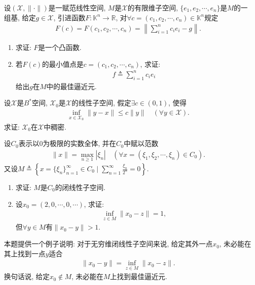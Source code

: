 \documentclass[../../main.tex]{subfiles}%
\begin{document}
\begin{example}
设$(\mathscr{X}, \|\cdot\|)$是一赋范线性空间, $M$是$\mathscr{X}$的有限维子空间, $\{e_1, e_2, \cdots, e_n\}$是$M$的一组基, 给定$g \in \mathscr{X}$, 引进函数$F: \mathbb{K}^n \to \mathbb{R}$, 对$\forall c = (c_1, c_2, \cdots, c_n) \in \mathbb{K}^n$规定
\begin{align*}
F(c) = F(c_1, c_2, \cdots, c_n) = \left\| \sum_{i=1}^{n} c_i e_i - g \right\|.
\end{align*}
\begin{enumerate}[(1)]
\item 求证: $F$是一个凸函数.
\item 若$F(c)$的最小值点是$c = (c_1, c_2, \cdots, c_n)$, 求证:
\begin{align*}
f \triangleq \sum_{i=1}^{n} c_i e_i
\end{align*}
给出$g$在$M$中的最佳逼近元.
\end{enumerate}
\end{example}

\begin{example}
设$\mathscr{X}$是$B^*$空间, $\mathscr{X}_0$是$\mathscr{X}$的线性子空间, 假定$\exists c \in (0, 1)$, 使得
\begin{align*}
\inf_{x \in \mathscr{X}_0} \|y - x\| \leqslant c \|y\| \quad (\forall y \in \mathscr{X}).
\end{align*}
求证: $\mathscr{X}_0$在$\mathscr{X}$中稠密.
\end{example}

\begin{example}
设$C_0$表示以$0$为极限的实数全体, 并在$C_0$中赋以范数
\begin{align*}
\|x\| = \max_{n \geqslant 1} |\xi_n| \quad (\forall x = (\xi_1, \xi_2, \cdots, \xi_n) \in C_0).
\end{align*}
又设$M \triangleq \left\{ x = \{\xi_n\}_{n=1}^{\infty} \in C_0 \mid \sum_{n=1}^{\infty} \frac{\xi_n}{2^n} = 0 \right\}$.
\begin{enumerate}[(1)]
\item 求证: $M$是$C_0$的闭线性子空间.
\item 设$x_0 = (2, 0, \cdots, 0, \cdots)$, 求证:
\begin{align*}
\inf_{z \in M} \|x_0 - z\| = 1,
\end{align*}
但$\forall y \in M$有$\|x_0 - y\| > 1$.
\end{enumerate}
\begin{remark}
本题提供一个例子说明: 对于无穷维闭线性子空间来说, 给定其外一点$x_0$, 未必能在其上找到一点$y$适合
\begin{align*}
\|x_0 - y\| = \inf_{z \in M} \|x_0 - z\|.
\end{align*}
换句话说, 给定$x_0 \notin M$, 未必能在$M$上找到最佳逼近元.
\end{remark}
\end{example}
\end{document}
